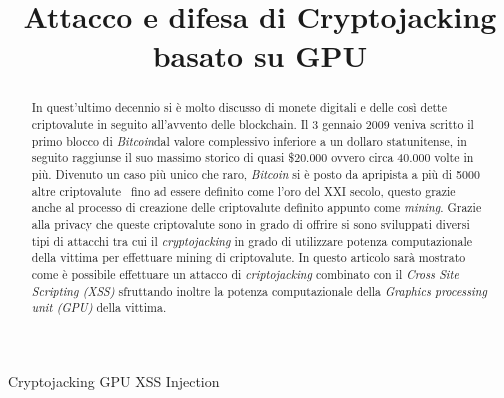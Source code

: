 \documentclass[conference]{IEEEtran}
\begin{document}
\title{Attacco e difesa di Cryptojacking basato su GPU
}

\author{
\and
{}
}

\maketitle

\begin{abstract}
In quest'ultimo decennio si è molto discusso di monete digitali e delle così dette criptovalute in seguito all'avvento delle blockchain. Il 3 gennaio 2009 veniva scritto il primo blocco di \emph{Bitcoin}dal valore complessivo inferiore a un dollaro statunitense, in seguito raggiunse il suo massimo storico di quasi \$20.000 ovvero circa 40.000 volte in più. Divenuto un caso più unico che raro, \emph{Bitcoin} si è posto da apripista a più di 5000 altre criptovalute~\citep{coinlore} fino ad essere definito come l'oro del \RN{21} secolo, questo grazie anche al processo di creazione delle criptovalute definito appunto come \emph{mining}. Grazie alla privacy che queste criptovalute sono in grado di offrire si sono sviluppati diversi tipi di attacchi tra cui il \emph{cryptojacking} in grado di utilizzare potenza computazionale della vittima per effettuare mining di criptovalute. In questo articolo sarà mostrato come è possibile effettuare un attacco di \emph{criptojacking} combinato con il \emph{Cross Site Scripting (XSS)} sfruttando inoltre la potenza computazionale della \emph{Graphics processing unit (GPU)} della vittima. \\
\end{abstract}

\begin{IEEEkeywords}
Cryptojacking GPU XSS Injection
\end{IEEEkeywords}
\end{document}
